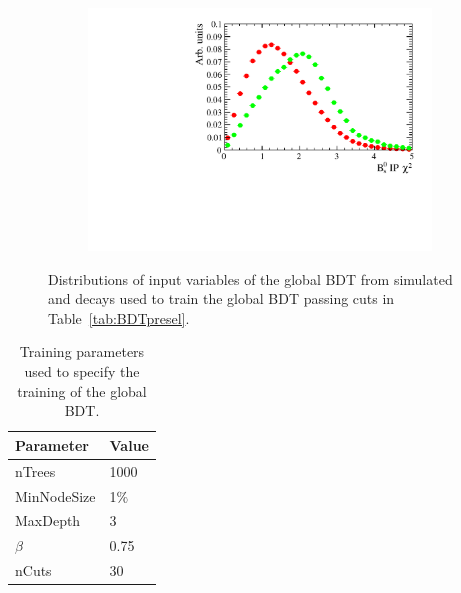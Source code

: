 \begin{figure}[htbp]
    \begin{subfigure}[b]{0.4\textwidth}
        \includegraphics[width=\textwidth]{./Figs/Selection/var5_sim_all.pdf}
    \end{subfigure}
    \caption{Distributions of input variables of the global BDT from simulated \bsmumu and \bbbarmumux decays used to train the global BDT passing cuts in Table~\ref{tab:BDTpresel}.}
    \label{fig:BDTvars}
\end{figure}


\begin{table}[htbp]
\begin{center}
\begin{tabular}{ll}
\hline
Parameter & Value \\ \hline
nTrees & 1000 \\
MinNodeSize & 1$\%$ \\
MaxDepth & 3 \\
$\beta$ & 0.75 \\
nCuts & 30 \\
\hline
\end{tabular}
\vspace{0.7cm}
\caption{Training parameters used to specify the training of the global BDT.}
\label{tab:BDTtrainingparams}
\end{center}
\end{table}




